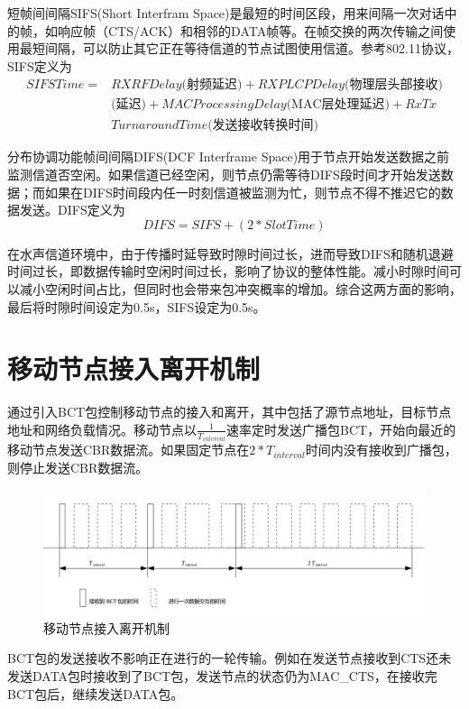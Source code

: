 短帧间间隔SIFS(Short Interfram Space)是最短的时间区段，用来间隔一次对话中的帧，如响应帧（CTS/ACK）和相邻的DATA帧等。在帧交换的两次传输之间使用最短间隔，可以防止其它正在等待信道的节点试图使用信道。参考802.11协议，SIFS定义为
\begin{equation}
\begin{aligned}
SIFSTime=&RXRFDelay\mbox{(射频延迟)}+RXPLCPDelay\mbox{(物理层头部接收)}\\&\mbox{(延迟)}+MACProcessingDelay\mbox{(MAC层处理延迟)}+ RxTx\\&TurnaroundTime\mbox{(发送接收转换时间)}
\end{aligned}
\end{equation}

分布协调功能帧间间隔DIFS(DCF Interframe Space)用于节点开始发送数据之前监测信道否空闲。如果信道已经空闲，则节点仍需等待DIFS段时间才开始发送数据；而如果在DIFS时间段内任一时刻信道被监测为忙，则节点不得不推迟它的数据发送。DIFS定义为
\begin{equation}
DIFS=SIFS+(2*SlotTime)
\end{equation}

在水声信道环境中，由于传播时延导致时隙时间过长，进而导致DIFS和随机退避时间过长，即数据传输时空闲时间过长，影响了协议的整体性能。减小时隙时间可以减小空闲时间占比，但同时也会带来包冲突概率的增加。综合这两方面的影响，最后将时隙时间设定为0.5s，SIFS设定为0.5s。
\section {移动节点接入离开机制}
通过引入BCT包控制移动节点的接入和离开，其中包括了源节点地址，目标节点地址和网络负载情况。移动节点以$\frac{1}{T_{interval}}$速率定时发送广播包BCT，开始向最近的移动节点发送CBR数据流。如果固定节点在$2*T_{interval}$时间内没有接收到广播包，则停止发送CBR数据流。
\begin{figure}[!ht]
	\centering
	\includegraphics[scale=0.4]{figures/mj.png}
	\caption{
		移动节点接入离开机制
	}
	\label{fig:example}
\end{figure}
BCT包的发送接收不影响正在进行的一轮传输。例如在发送节点接收到CTS还未发送DATA包时接收到了BCT包，发送节点的状态仍为MAC\_CTS，在接收完BCT包后，继续发送DATA包。

